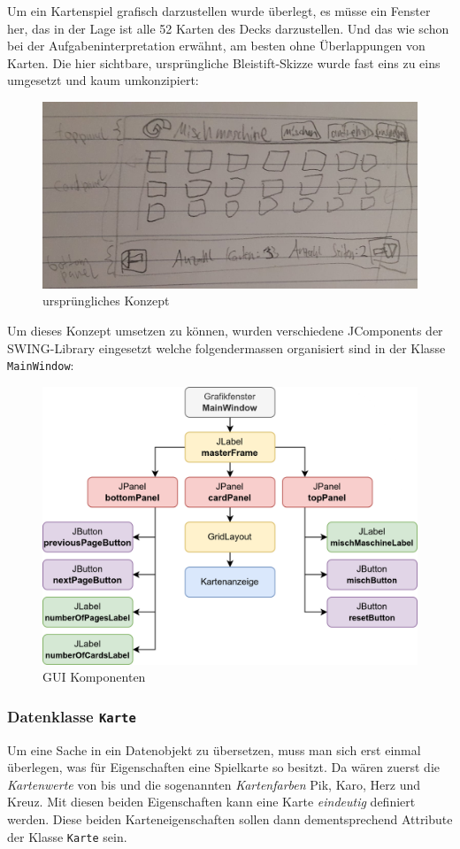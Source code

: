 \documentclass[a4paper,11pt]{article}
\begin{document}
Um ein Kartenspiel grafisch darzustellen wurde überlegt, es müsse ein Fenster her, das in der Lage ist alle 52 Karten des Decks darzustellen. Und das wie schon bei der Aufgabeninterpretation erwähnt, am besten ohne Überlappungen von Karten. Die hier sichtbare, ursprüngliche Bleistift-Skizze wurde fast eins zu eins umgesetzt und kaum umkonzipiert:

\begin{figure}[H]
    \centering
    \includegraphics[width=.6\textwidth]{media/skizze.png}
    \caption{ursprüngliches Konzept}
\end{figure}

Um dieses Konzept umsetzen zu können, wurden verschiedene JComponents der SWING-Library eingesetzt welche folgendermassen organisiert sind in der Klasse \texttt{MainWindow}:

\begin{figure}[H]
    \centering
    \includegraphics[width=.7\textwidth]{media/gui-overview.png}
    \caption{GUI Komponenten}
\end{figure}

\subsubsection{Datenklasse \texttt{Karte}}
Um eine Sache in ein Datenobjekt zu übersetzen, muss man sich erst einmal überlegen, was für Eigenschaften eine Spielkarte so besitzt. Da wären zuerst die \textit{Kartenwerte} von  bis  und die sogenannten \textit{Kartenfarben} Pik, Karo, Herz und Kreuz. Mit diesen beiden Eigenschaften kann eine Karte \textit{eindeutig} definiert werden. Diese beiden Karteneigenschaften sollen dann dementsprechend Attribute der Klasse \texttt{Karte} sein.\\
\end{document}
